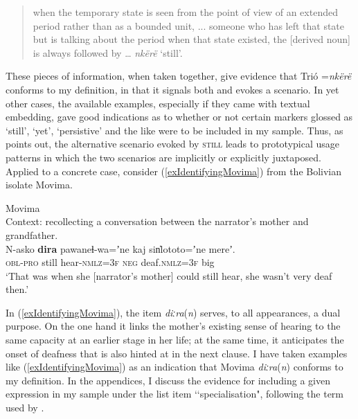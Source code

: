 \begin{quote}
	when the temporary state is seen from the point of view of an extended period rather than as a bounded unit, ... someone who has left that state but is talking about the period when that state existed, the [derived noun] is always followed by … \textit{nkërë} \lq still'. \parencite[130]{Carlin2004}
\end{quote}

These pieces of information, when taken together, give evidence that Trió \mbox{=\textit{nkërë}} conforms to my definition, in that it signals both  and evokes a  scenario. In yet other cases, the available examples, especially if they came with textual embedding, gave good indications as to whether or not certain markers glossed as \lq still', \lq yet', \lq persistive\rq{} and the like were to be included in my sample. Thus, as \textcite[182–183]{Loebner1989} points out, the alternative scenario evoked by \textsc{still} leads to prototypical usage patterns in which the two scenarios are implicitly or explicitly juxtaposed. Applied to a concrete case, consider (\ref{exIdentifyingMovima}) from the Bolivian isolate Movima.

\begin{exe}
	\ex Movima\label{exIdentifyingMovima}\\
	Context: recollecting a conversation between the narrator's mother and grandfather. \\
	\gll N-asko \textbf{dira} pawaneɬ-wa=ʼne kaj sin̍lototo=ʼne mereʼ.\\
\textsc{obl}-\textsc{pro} still hear-\textsc{nmlz}=3\textsc{f} \textsc{neg} deaf.\textsc{nmlz}=3\textsc{f} big\\
	\glt \lq That was when she [narrator's mother] could still hear, she wasn't very deaf then.\rq{ }\parencite{MovimaCorpus}
\end{exe}

In (\ref{exIdentifyingMovima}), the item \mbox{\textit{diːra}(\textit{n})} serves, to all appearances, a dual purpose. On the one hand it links the mother's existing sense of hearing to the same capacity at an earlier stage in her life; at the same time, it anticipates the onset of deafness that is also hinted at in the next clause. I have taken examples like (\ref{exIdentifyingMovima}) as an indication that  Movima \mbox{\textit{diːra}(\textit{n})} conforms to my definition. In the appendices, I discuss the evidence for including a given expression in my sample under the list item \lq\lq specialisation", following the term used by \textcite{vanBaar1997}.

